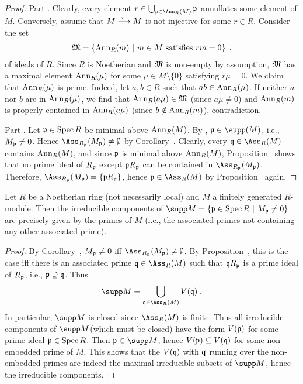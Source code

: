 \documentclass[a4paper,parskip=half,numbers=enddot, DIV=12]{scrreprt}
\begin{document}
\begin{proof}
	Part . Clearly, every element $r\in \bigcup_{\pp\in \Ass_R(M)}\pp$ annullates some element of $M$. Conversely, assume that $M\morphism[\smash{r\cdot}]M$ is not injective for some $r\in R$. Consider the set
	\begin{align*}
		\mathfrak{M}=\left\{\operatorname{Ann}_R(m)\ \middle|\  m\in M\text{ satisfies }rm=0\right\}\;.
	\end{align*}
	of ideals of $R$. Since $R$ is Noetherian and $\mathfrak{M}$ is non-empty by assumption, $\mathfrak{M}$ has a maximal element $\operatorname{Ann}_R(\mu)$ for some $\mu\in M\setminus\{0\}$ satisfying $r\mu=0$. We claim that $\operatorname{Ann}_R(\mu)$ is prime. Indeed, let $a,b\in R$ such that $ab\in \operatorname{Ann}_R(\mu)$. If neither $a$ nor $b$ are in $\operatorname{Ann}_R(\mu)$, we find that $\operatorname{Ann}_R(a\mu)\in\mathfrak{M}$ (since $a\mu\neq 0$) and $\operatorname{Ann}_R(m)$ is properly contained in $\operatorname{Ann}_R(a\mu)$ (since $b\notin\operatorname{Ann}_R(m)$), contradiction.
	
	Part . Let $\mathfrak{p}\in\operatorname{Spec} R$ be minimal above $\operatorname{Ann}_R(M)$. By \cite[Lemma~3.4.1]{alg2}, $\pp\in\supp(M)$, i.e., $M_{\mathfrak{p}}\neq 0$. Hence $\Ass_{R_\pp}(M_\pp)\neq\emptyset$ by Corollary~. Clearly, every $\qq\in\Ass_R(M)$ contains $\operatorname{Ann}_R(M)$, and since $\mathfrak{p}$ is minimal above $\operatorname{Ann}_R(M)$, Proposition~ shows that no prime ideal of $R_{\mathfrak{p}}$ except $\mathfrak{p} R_{\mathfrak{p}}$ can be contained in $\Ass_{R_\pp}(M_\pp)$. Therefore, $\Ass_{R_\pp}(M_\pp)=\{\pp R_\pp\}$, hence $\pp\in\Ass_R(M)$ by Proposition~ again.
\end{proof}
\begin{fact}
	Let $R$ be a Noetherian ring (not necessarily local) and $M$ a finitely generated $R$-module. Then the irreducible components of $\supp M=\left\{\pp\in\Spec R\st M_\pp\neq 0\right\}$ are precisely given by the  primes of $M$ (i.e., the associated primes not containing any other associated prime).
\end{fact}
\begin{proof}
	By Corollary~, $M_{\mathfrak{p}}\neq 0$ iff $\Ass_{R_\pp}(M_\pp)\neq\emptyset$. By Proposition~, this is the case iff there is an associated prime $\qq\in \Ass_R(M)$ such that $\mathfrak{q} R_{\mathfrak{p}}$ is a prime ideal of $R_{\mathfrak{p}}$, i.e., $\mathfrak{p}\supseteq \mathfrak{q}$. Thus
	\begin{align*}
		\supp M=\bigcup_{\qq\in\Ass_R(M)}V(\qq)\;.
	\end{align*}
	In particular, $\supp M$ is closed since $\Ass_R(M)$ is finite. Thus all irreducible components of $\supp M$(which must be closed)  have the form $V(\mathfrak{p})$ for some prime ideal $\mathfrak{p}\in\operatorname{Spec} R$. Then $\pp\in\supp M$, hence $V(\mathfrak{p})\subseteq V(\mathfrak{q})$ for some non-embedded prime of $M$. This shows that the $V(\mathfrak{q})$ with $\mathfrak{q}$ running over the non-embedded primes are indeed the maximal irreducible subsets of $\supp M$, hence the irreducible components.
\end{proof}


\printbibliography
\end{document}
